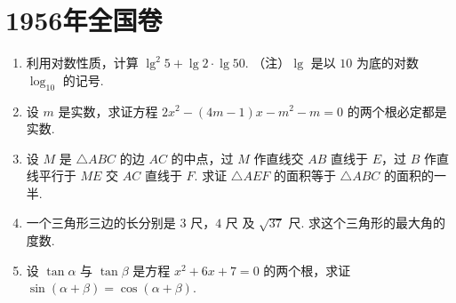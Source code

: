 \chapter{1956年全国卷}

\begin{problem}
\begin{enumerate}
\item 利用对数性质，计算 \(\lg^{2}5+\lg2\cdot\lg50\). （注）\(\lg\) 是以 \(10\) 为底的对数 \(\log_{10}\) 的记号.

\item 设 \(m\) 是实数，求证方程 \(2x^{2}-\left(4m-1\right)x-m^{2}-m=0\) 的两个根必定都是实数.

\item 设 \(M\) 是 \(\triangle ABC\) 的边 \(AC\) 的中点，过 \(M\) 作直线交 \(AB\) 直线于 \(E\)，过 \(B\) 作直线平行于 \(ME\) 交 \(AC\) 直线于 \(F\). 求证 \(\triangle AEF\) 的面积等于 \(\triangle ABC\) 的面积的一半.

\item 一个三角形三边的长分别是 \(3\text{ 尺}\)，\(4\text{ 尺}\) 及 \(\sqrt{37}\text{ 尺}\). 求这个三角形的最大角的度数.

\item 设 \(\tan\alpha\) 与 \(\tan\beta\) 是方程 \(x^{2}+6x+7=0\) 的两个根，求证 \(\sin\left(\alpha+\beta\right)=\cos\left(\alpha+\beta\right)\).
\end{enumerate}
\end{problem}

